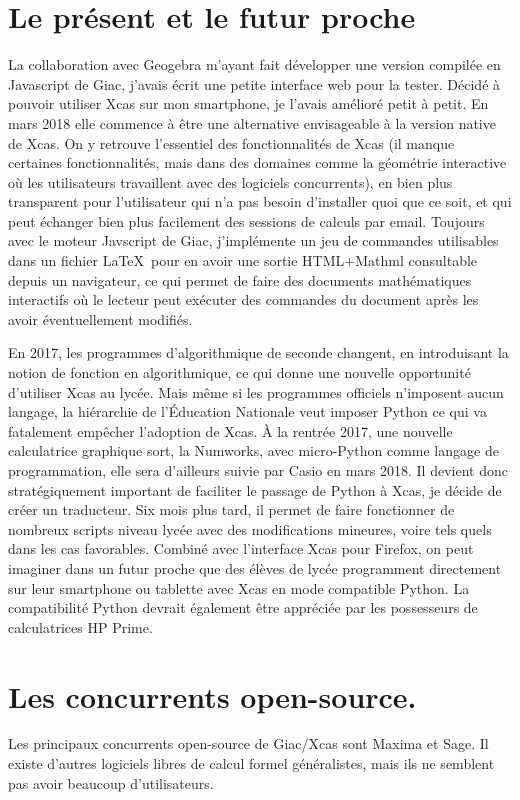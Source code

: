 \documentclass[a4paper,11pt]{book}
\begin{document}
\begin{giacjshere}
\section{Le pr\'esent et le futur proche}
La collaboration avec Geogebra m'ayant fait d\'evelopper une version 
compil\'ee en Javascript de Giac, j'avais \'ecrit 
une petite interface web pour la tester. D\'ecid\'e \`a pouvoir
utiliser Xcas sur mon smartphone, je l'avais am\'elior\'e petit \`a
petit. En mars 2018 elle commence \`a \^etre une alternative envisageable \`a la
version native de Xcas. On y retrouve l'essentiel des fonctionnalit\'es
de Xcas (il manque certaines fonctionnalit\'es, mais dans des domaines
comme la g\'eom\'etrie interactive o\`u les utilisateurs 
travaillent avec des logiciels concurrents), en bien plus transparent
pour l'utilisateur qui n'a pas besoin
d'installer quoi que ce soit, et qui peut
\'echanger bien plus facilement des sessions de calculs par email.
Toujours avec le moteur Javscript de Giac, j'impl\'emente un
jeu de commandes utilisables dans un fichier \LaTeX\ pour en
avoir une sortie HTML+Mathml consultable depuis un navigateur, ce
qui permet de faire des documents math\'ematiques interactifs o\`u
le lecteur peut ex\'ecuter des commandes du document 
apr\`es les avoir \'eventuellement modifi\'es.

En 2017, les programmes d'algorithmique de seconde changent, en introduisant
la notion de fonction en algorithmique, ce qui donne une nouvelle
opportunit\'e d'utiliser Xcas au lyc\'ee. Mais m\^eme si les programmes
officiels n'imposent aucun langage, la hi\'erarchie de l'\'Education
Nationale veut imposer Python
ce qui va fatalement emp\^echer l'adoption de Xcas. \`A la rentr\'ee 2017,
une nouvelle calculatrice graphique sort, la Numworks, avec micro-Python
comme langage de programmation, elle sera d'ailleurs
suivie par Casio en mars 2018. 
Il devient donc strat\'egiquement 
important de faciliter le passage de Python \`a Xcas, je d\'ecide
de cr\'eer un traducteur. Six mois plus tard, il permet de faire
fonctionner de nombreux scripts niveau lyc\'ee avec
des modifications mineures, voire tels quels dans les cas favorables.
Combin\'e avec l'interface Xcas pour Firefox, on peut imaginer
dans un futur proche que des \'el\`eves de lyc\'ee programment
directement sur leur smartphone ou tablette
avec Xcas en mode compatible Python. La compatibilit\'e Python
devrait \'egalement \^etre appr\'eci\'ee par les possesseurs
de calculatrices HP Prime.

\section{Les concurrents open-source.} \label{sec:concurrents}
Les principaux concurrents open-source de Giac/Xcas sont Maxima et
Sage. Il existe d'autres logiciels libres de calcul formel 
g\'en\'eralistes, mais ils
ne semblent pas avoir beaucoup d'utilisateurs.


\end{giacjshere}
\end{document}
